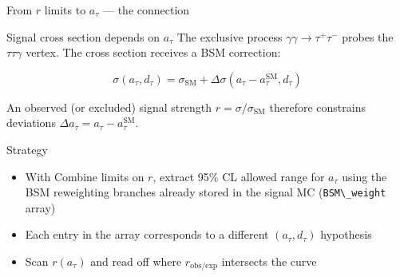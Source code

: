 \begin{frame}[fragile]{From \(r\) limits to \(a_\tau\) --- the
connection}
\protect{}\label{from-r-limits-to-a_tau-the-connection}
\begin{block}{Signal cross section depends on \(a_\tau\)}
\protect{}\label{signal-cross-section-depends-on-a_tau}
The exclusive process \(\gamma\gamma \to \tau^+\tau^-\) probes the
\(\tau\tau\gamma\) vertex. The cross section receives a BSM correction:

\[\sigma(a_\tau, d_\tau) = \sigma_\text{SM} + \Delta\sigma(a_\tau - a_\tau^\text{SM}, d_\tau)\]

An observed (or excluded) signal strength
\(r = \sigma/\sigma_\text{SM}\) therefore constrains deviations
\(\Delta a_\tau = a_\tau - a_\tau^\text{SM}\).
\end{block}

\begin{block}{Strategy}
\protect{}\label{strategy}
\begin{itemize}
\tightlist
\item
  With Combine limits on \(r\), extract 95\% CL allowed range for
  \(a_\tau\) using the BSM reweighting branches already stored in the
  signal MC (\texttt{BSM\textbackslash{}\_weight} array)
\item
  Each entry in the array corresponds to a different
  \((a_\tau, d_\tau)\) hypothesis
\item
  Scan \(r(a_\tau)\) and read off where \(r_\text{obs/exp}\) intersects
  the curve
\end{itemize}
\end{block}
\end{frame}

